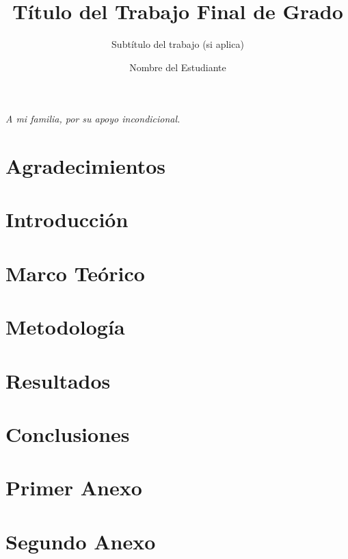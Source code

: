\documentclass{upsabo}
\title{Título del Trabajo Final de Grado}
\subtitle{Subtítulo del trabajo (si aplica)} %
\author{Nombre del Estudiante}
\begin{document}
\maketitle

\cleardoublepage
\thispagestyle{empty}
\begin{flushright}
\textit{A mi familia, por su apoyo incondicional.}
\end{flushright}
\cleardoublepage

\chapter*{Agradecimientos}
\thispagestyle{empty}
\lipsum[1-2]
\cleardoublepage

\tableofcontents
\cleardoublepage
\listoftables
\cleardoublepage
\listoffigures
\cleardoublepage

\chapter{Introducción}
\lipsum[1-5]

\chapter{Marco Teórico}
\lipsum[6-10]

\chapter{Metodología}
\lipsum[11-15]

\chapter{Resultados}
\lipsum[16-20]

\chapter{Conclusiones}
\lipsum[21-25]

\cleardoublepage



\appendix
\cleardoublepage
\listofappendices

\chapter{Primer Anexo}
\lipsum[26-30]

\chapter{Segundo Anexo}
\lipsum[31-35]
\end{document}
